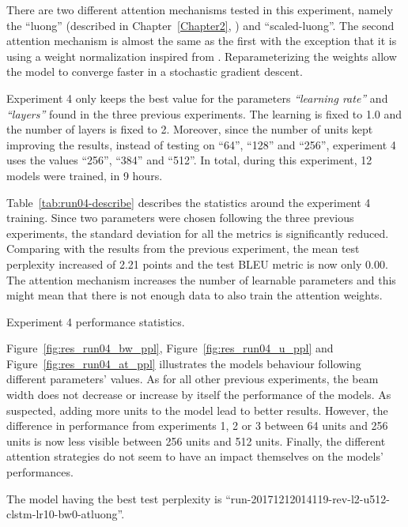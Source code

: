 There are two different attention mechanisms tested in this experiment, namely the ``luong'' (described in Chapter~\ref{Chapter2}, \citet{nmt-phd}) and ``scaled-luong''. The second attention mechanism is almost the same as the first with the exception that it is using a weight normalization inspired from \citet{1602.07868}. Reparameterizing the weights allow the model to converge faster in a stochastic gradient descent.

Experiment 4 only keeps the best value for the parameters \textit{``learning rate''} and \textit{``layers''} found in the three previous experiments. The learning is fixed to \num{1.0} and the number of layers is fixed to \num{2}.
Moreover, since the number of units kept improving the results, instead of testing on ``64'', ``128'' and ``256'', experiment 4 uses the values ``256'', ``384'' and ``512''. In total, during this experiment, 12 models were trained, in 9 hours.

Table~\ref{tab:run04-describe} describes the statistics around the experiment 4 training. Since two parameters were chosen following the three previous experiments, the standard deviation for all the metrics is significantly reduced. Comparing with the results from the previous experiment, the mean test perplexity increased of \num{2.21} points and the test BLEU metric is now only \num{0.00}. The attention mechanism increases the number of learnable parameters and this might mean that there is not enough data to also train the attention weights.

\begin{table}
    \centering
    \caption[Experiment 4 performance statistics]{Experiment 4 performance statistics.}
    \label{tab:run04-describe}
    
\end{table}

Figure~\ref{fig:res_run04_bw_ppl}, Figure~\ref{fig:res_run04_u_ppl} and Figure~\ref{fig:res_run04_at_ppl} illustrates the models behaviour following different parameters' values. As for all other previous experiments, the beam width does not decrease or increase by itself the performance of the models. As suspected, adding more units to the model lead to better results. However, the difference in performance from experiments 1, 2 or 3 between 64 units and 256 units is now less visible between 256 units and 512 units. Finally, the different attention strategies do not seem to have an impact themselves on the models' performances.

The model having the best test perplexity is ``run-20171212014119-rev-l2-u512-clstm-lr10-bw0-atluong''.

